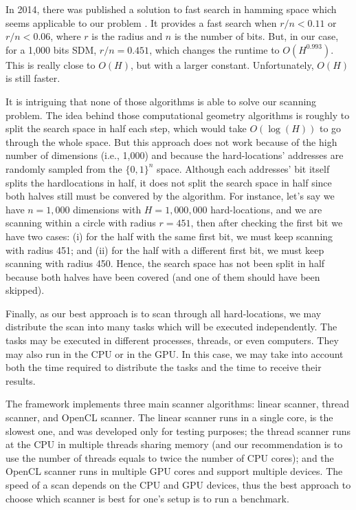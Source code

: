 In 2014, there was published a solution to fast search in hamming space which seems applicable to our problem \citet{norouzi2014fast}. It provides a fast search when $r/n < 0.11$ or $r/n < 0.06$, where $r$ is the radius and $n$ is the number of bits. But, in our case, for a 1,000 bits SDM, $r/n = 0.451$, which changes the runtime to $O(H^{0.993})$. This is really close to $O(H)$, but with a larger constant. Unfortunately, $O(H)$ is still faster.

It is intriguing that none of those algorithms is able to solve our scanning problem. The idea behind those computational geometry algorithms is roughly to split the search space in half each step, which would take $O(\log(H))$ to go through the whole space. But this approach does not work because of the high number of dimensions (i.e., 1,000) and because the hard-locations' addresses are randomly sampled from the $\{0, 1\}^n$ space. Although each addresses' bit itself splits the hardlocations in half, it does not split the search space in half since both halves still must be convered by the algorithm. For instance, let's say we have $n=1,000$ dimensions with $H=1,000,000$ hard-locations, and we are scanning within a circle with radius $r=451$, then after checking the first bit we have two cases: (i) for the half with the same first bit, we must keep scanning with radius 451; and (ii) for the half with a different first bit, we must keep scanning with radius 450. Hence, the search space has not been split in half because both halves have been covered (and one of them should have been skipped).

Finally, as our best approach is to scan through all hard-locations, we may distribute the scan into many tasks which will be executed independently. The tasks may be executed in different processes, threads, or even computers. They may also run in the CPU or in the GPU. In this case, we may take into account both the time required to distribute the tasks and the time to receive their results.

The framework implements three main scanner algorithms: linear scanner, thread scanner, and OpenCL scanner. The linear scanner runs in a single core, is the slowest one, and was developed only for testing purposes; the thread scanner runs at the CPU in multiple threads sharing memory (and our recommendation is to use the number of threads equals to twice the number of CPU cores); and the OpenCL scanner runs in multiple GPU cores and support multiple devices. The speed of a scan depends on the CPU and GPU devices, thus the best approach to choose which scanner is best for one's setup is to run a benchmark.

